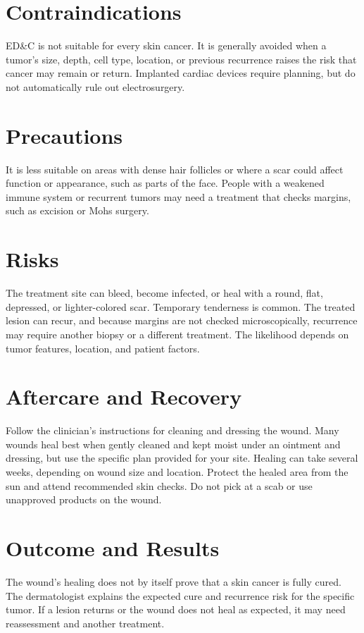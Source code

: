 \section*{Contraindications}
ED\&C is not suitable for every skin cancer. It is generally avoided when a tumor's size, depth, cell type, location, or previous recurrence raises the risk that cancer may remain or return. Implanted cardiac devices require planning, but do not automatically rule out electrosurgery.

\section*{Precautions}
It is less suitable on areas with dense hair follicles or where a scar could affect function or appearance, such as parts of the face. People with a weakened immune system or recurrent tumors may need a treatment that checks margins, such as excision or Mohs surgery.

\section*{Risks}
The treatment site can bleed, become infected, or heal with a round, flat, depressed, or lighter-colored scar. Temporary tenderness is common. The treated lesion can recur, and because margins are not checked microscopically, recurrence may require another biopsy or a different treatment. The likelihood depends on tumor features, location, and patient factors.

\section*{Aftercare and Recovery}
Follow the clinician's instructions for cleaning and dressing the wound. Many wounds heal best when gently cleaned and kept moist under an ointment and dressing, but use the specific plan provided for your site. Healing can take several weeks, depending on wound size and location. Protect the healed area from the sun and attend recommended skin checks. Do not pick at a scab or use unapproved products on the wound.

\section*{Outcome and Results}
The wound's healing does not by itself prove that a skin cancer is fully cured. The dermatologist explains the expected cure and recurrence risk for the specific tumor. If a lesion returns or the wound does not heal as expected, it may need reassessment and another treatment.

